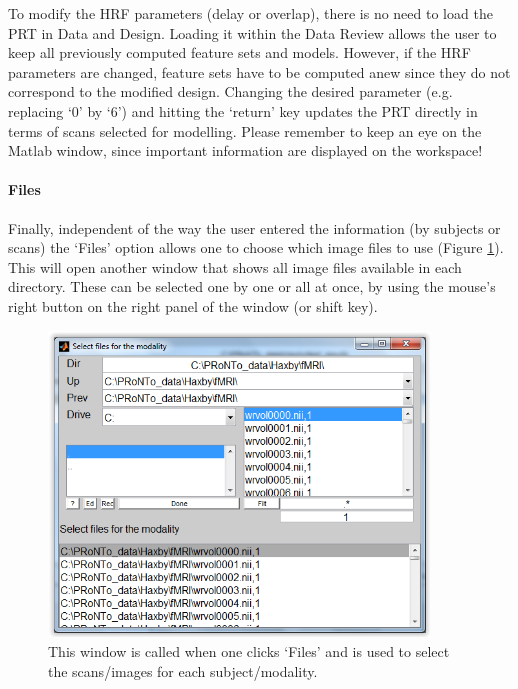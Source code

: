 To modify the HRF parameters (delay or overlap), there is no need to load the PRT in Data and Design. Loading it within the Data Review allows the user to keep all previously computed feature sets and models. However, if the HRF parameters are changed, feature sets have to be computed anew since they do not correspond to the modified design. Changing the desired parameter (e.g. replacing `0' by `6') and hitting the `return' key updates the PRT directly in terms of scans selected for modelling. 
Please remember to keep an eye on the Matlab window, since important information are displayed on the workspace!

\paragraph{Files} Finally, independent of the way the user entered the information (by subjects or scans) the `Files' option allows one to choose which image files to use (Figure \ref{Fig2.6}). This will open another window that shows all image files available in each directory. These can be selected one by one or all at once, by using the mouse's right button on the right panel of the window (or shift key).

\begin{figure}[!h]
  \begin{center}
      \includegraphics[height=3.2in]{images/Figure6.png}
   \caption{This window is called when one clicks `Files' and is used to select the scans/images for each subject/modality.}
    \label{Fig2.6}
  \end{center}
\end{figure}

